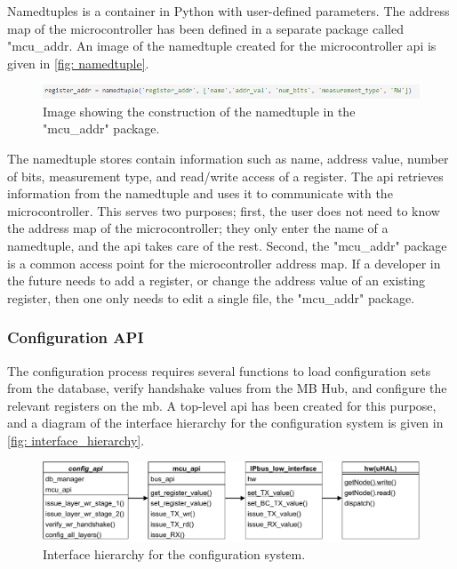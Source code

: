 \documentclass[main.tex]{subfiles}
\begin{document}
Namedtuples is a container in Python with user-defined parameters. The address map of the microcontroller has been defined in a separate package called "mcu\_addr. An image of the namedtuple created for the microcontroller \gls{api} is given in \autoref{fig: namedtuple}.


\begin{figure}[!ht]
    \centering
    \includegraphics[width=15cm, scale=4]{images/namedtuple.png}
    \caption{Image showing the construction of the namedtuple in the "mcu\_addr" package.}
    \label{fig: namedtuple}
\end{figure}
\FloatBarrier

The namedtuple stores contain information such as name, address value, number of bits, measurement type, and read/write access of a register. The \gls{api} retrieves information from the namedtuple and uses it to communicate with the microcontroller. This serves two purposes; first, the user does not need to know the address map of the microcontroller; they only enter the name of a namedtuple, and the \gls{api} takes care of the rest. Second, the "mcu\_addr" package is a common access point for the microcontroller address map. If a developer in the future needs to add a register, or change the address value of an existing register, then one only needs to edit a single file, the "mcu\_addr" package.


\subsubsection{Configuration API}

The configuration process requires several functions to load configuration sets from the database, verify handshake values from the MB Hub, and configure the relevant registers on the \gls{mb}. A top-level \gls{api} has been created for this purpose, and a diagram of the interface hierarchy for the configuration system is given in \autoref{fig: interface_hierarchy}.


\begin{figure}[!ht]
    \centering
    \includegraphics[width=15cm, scale=4]{images/interface_hierarchy.pdf}
    \caption{Interface hierarchy for the configuration system.}
    \label{fig: interface_hierarchy}
\end{figure}
\FloatBarrier
\end{document}
